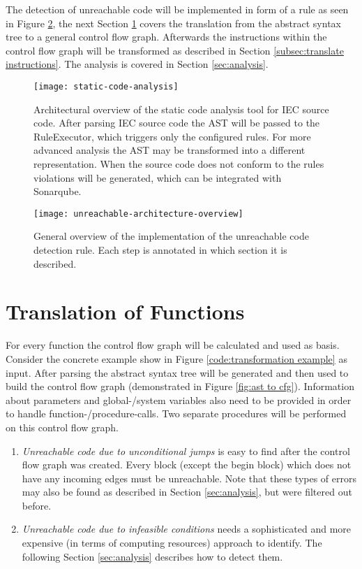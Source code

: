 The detection of unreachable code will be implemented in form of a rule as seen in Figure \ref{fig:unreachable-architecture-overview}, the next Section \ref{sec:translation} covers the translation from the abstract syntax tree to a general control flow graph. 
Afterwards the instructions within the control flow graph will be transformed as described in Section \ref{subsec:translate instructions}.
The analysis is covered in Section \ref{sec:analysis}.

\begin{figure}
	\centering
	\texttt{[image: static-code-analysis]}
	\caption{Architectural overview of the static code analysis tool for IEC source code. After parsing IEC source code the AST will be passed to the RuleExecutor, which triggers only the configured rules. For more advanced analysis the AST may be transformed into a different representation. When the source code does not conform to the rules violations will be generated, which can be integrated with Sonarqube.}
	\label{fig:general architecture}
\end{figure}

\begin{figure}
	\centering
	\texttt{[image: unreachable-architecture-overview]}
	\caption{General overview of the implementation of the unreachable code detection rule. Each step is annotated in which section it is described. }
	\label{fig:unreachable-architecture-overview}
\end{figure}

\section{Translation of Functions}
\label{sec:translation}
For every function the control flow graph will be calculated and used as basis. 
Consider the concrete example show in Figure \ref{code:transformation example} as input. 
After parsing the abstract syntax tree will be generated and then used to build the control flow graph (demonstrated in Figure \ref{fig:ast to cfg}).
Information about parameters and global-/system variables also need to be provided in order to handle function-/procedure-calls. 
Two separate procedures will be performed on this control flow graph.
\begin{enumerate}
	\item \emph{Unreachable code due to unconditional jumps} is easy to find after the control flow graph was created. Every block (except the begin block) which does not have any incoming edges must be unreachable.
	Note that these types of errors may also be found as described in Section \ref{sec:analysis}, but were filtered out before.
	\item \emph{Unreachable code due to infeasible conditions} needs a sophisticated and more expensive (in terms of computing resources) approach to identify. The following Section \ref{sec:analysis} describes how to detect them.
\end{enumerate}


